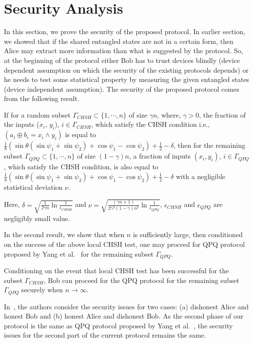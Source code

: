 \documentclass[twocolumn,pra,aps,amssymb]{revtex4}
\begin{document}
\section{Security Analysis} 
In this section, we prove the security of the proposed protocol. In earlier section, we showed that if the shared entangled states are not in a certain form, then Alice may extract more information than what is suggested by the protocol. So, at the beginning of the protocol either Bob has to trust devices blindly (device dependent assumption on which the security of the existing protocols depends) or he needs to test some statistical property by measuring the given entangled states (device independent assumption). The security of the proposed protocol comes from the following result.
\begin{theorem}
\label{thm1}
If for a random subset $\Gamma_{CHSH}\subset \{1,\cdots,n\}$ of size $\gamma n$, where, $\gamma>0$, the fraction of the inputs ($x_i$, $y_i$), $i\in\Gamma_{CHSH}$, which satisfy the CHSH condition i.e., $(a_i\oplus b_i=x_i\wedge y_i)$ is equal to $\frac{1}{8}(\sin{\theta}(\sin\psi_1+\sin\psi_2)+\cos\psi_1-\cos\psi_2)+\frac{1}{2}-\delta$, then for the remaining subset $\Gamma_{QPQ} \subset \{1,\cdots,n\}$ of size $(1-\gamma)n$, a fraction of inputs $(x_i,y_i)$, $i\in \Gamma_{QPQ}$, which satisfy the CHSH condition, is also equal to $\frac{1}{8}(\sin{\theta}(\sin\psi_1+\sin\psi_2)+\cos\psi_1-\cos\psi_2)+\frac{1}{2}-\delta$ with a negligible statistical deviation $\nu$. 

 Here, $\delta=\sqrt{\frac{1}{2\gamma n} \ln{\frac{1}{\epsilon_{CHSH}}}}$ and $\nu=\sqrt{\frac{(\gamma n+1)}{2\gamma^2(1-\gamma)n^2}\ln{\frac{1}{\epsilon_{QPQ}}}}$, $\epsilon_{CHSH}$ and $\epsilon_{QPQ}$ are negligibly small value.
\end{theorem} 

In the second result, we show that when $n$ is sufficiently large, then conditioned on the success of the above local CHSH test, one may proceed for QPQ protocol proposed by Yang et al.~\cite{Yang} for the remaining subset $\Gamma_{QPQ}$.
\begin{theorem}
\label{thm2}
 Conditioning on the event that local CHSH test has been successful for the subset $\Gamma_{CHSH}$, Bob can proceed for the QPQ protocol for the remaining subset $\Gamma_{QPQ}$ securely when $n\rightarrow \infty$.
 \end{theorem}

In~\cite{Yang}, the authors consider the security issues for two cases: (a) dishonest Alice and honest Bob and (b) honest Alice and dishonest Bob.
As the second phase of our protocol is the same as QPQ protocol proposed by Yang et al.~\cite{Yang}, the security issues for the second part of the current protocol remains the same. \medskip
\end{document}
